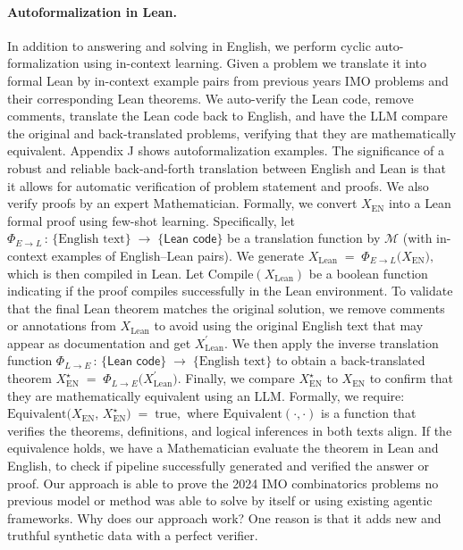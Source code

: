 \paragraph{Autoformalization in \textsf{Lean}.}
In addition to answering and solving in English, we perform cyclic auto-formalization using in-context learning. Given a problem we translate it into formal Lean by in-context example pairs from previous years IMO problems and their corresponding Lean theorems. We auto-verify the Lean code, remove comments, translate the Lean code back to English, and have the LLM compare the original and back-translated problems, verifying that they are mathematically equivalent. Appendix J shows autoformalization examples. The significance of a robust and reliable back-and-forth translation between English and Lean is that it allows for automatic verification of problem statement and proofs. We also verify proofs by an expert Mathematician. Formally, we convert $X_{\mathrm{EN}}$ into a \textsf{Lean} formal proof using few-shot learning. Specifically, let $\Phi_{E \to L}\,\colon\,
\{\text{English text}\}\;\to\;\{\textsf{Lean code}\}$ be a translation function by \(\mathcal{M}\) (with in-context examples of English--\textsf{Lean} pairs). We generate $X_{\mathrm{Lean}} 
\;=\; \Phi_{E \to L}\bigl(X_{\mathrm{EN}}\bigr),$
which is then compiled in \textsf{Lean}. Let \(\mathrm{Compile}(X_{\mathrm{Lean}})\) be a boolean function indicating if the proof compiles successfully in the \textsf{Lean} environment. To validate that the final \textsf{Lean} theorem matches the original solution, we remove comments or annotations from $X_{\mathrm{Lean}}$ to avoid using the original English text that may appear as documentation and get $X_{\mathrm{Lean}}^{\prime}$. We then apply the inverse translation function $\Phi_{L \to E}\,\colon\,
\{\textsf{Lean code}\}\;\to\;\{\text{English text}\}$ to obtain a back-translated theorem $X_{\mathrm{EN}}^\star \;=\; \Phi_{L \to E}\bigl(X_{\mathrm{Lean}}^{\prime}\bigr).$ Finally, we compare \(X_{\mathrm{EN}}^\star\) to \(X_{\mathrm{EN}}\) to confirm that they are mathematically equivalent using an LLM. Formally, we require:
$\mathrm{Equivalent}\bigl(X_{\mathrm{EN}},\,X_{\mathrm{EN}}^\star\bigr) 
\;=\; \text{true},
$
where \(\mathrm{Equivalent}(\cdot,\cdot)\) is a function that verifies the theorems, definitions, and logical inferences in both texts align. If the equivalence holds, we have a Mathematician evaluate the theorem in Lean and English, to check if pipeline successfully generated and verified the answer or proof. Our approach is able to prove the 2024 IMO combinatorics problems no previous model or method was able to solve by itself or using existing agentic frameworks. Why does our approach work? One reason is that it adds new and truthful synthetic data with a perfect verifier. 

